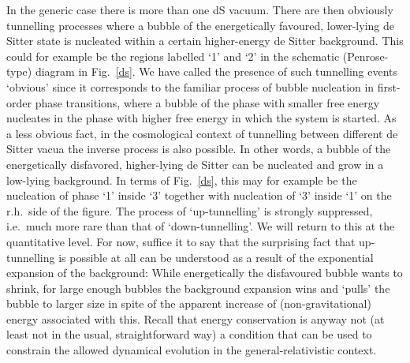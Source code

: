 \documentclass[12pt]{article}
\numberwithin{equation}{section}
\begin{document}
In the generic case there is more than one dS vacuum. There are then obviously tunnelling processes where a bubble of the energetically favoured, lower-lying de Sitter state is nucleated within a certain higher-energy de Sitter background. This could for example be the regions labelled `1' and `2' in the schematic (Penrose-type) diagram in Fig.~\ref{ds}. We have called the presence of such tunnelling events `obvious' since it corresponds to the familiar process of bubble nucleation in first-order phase transitions, where a bubble of the phase with smaller free energy nucleates in the phase with higher free energy in which the system is started. As a less obvious fact, in the cosmological context of tunnelling between different de Sitter vacua the inverse process is also possible. In other words, a bubble of the energetically disfavored, higher-lying de Sitter can be nucleated and grow in a low-lying background. In terms of Fig.~\ref{ds}, this may for example be the nucleation of phase `1' inside `3' together with nucleation of `3' inside `1' on the r.h.~side of the figure. The process of `up-tunnelling' is strongly suppressed, i.e.~much more rare than that of `down-tunnelling'. We will return to this at the quantitative level. For now, suffice it to say that the surprising fact that up-tunnelling is possible at all can be understood as a result of the exponential expansion of the background: While energetically the disfavoured bubble wants to shrink, for large enough bubbles the background expansion wins and `pulls' the bubble to larger size in spite of the apparent increase of (non-gravitational) energy associated with this. Recall that energy conservation is anyway not (at least not in the usual, straightforward way) a condition that can be used to constrain the allowed dynamical evolution in the general-relativistic context.
\end{document}
